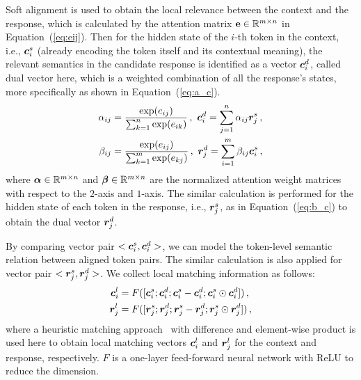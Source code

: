 \documentclass[letterpaper]{article} \usepackage{aaai19}  \usepackage{times}  \usepackage{helvet}  \usepackage{courier}  \usepackage{url}  \usepackage{graphicx}
\newcommand{\mat}[1]{\bf{#1}}
\newcommand{\RR}{\mathbb{R}}
\begin{document}
Soft alignment is used to obtain the local relevance between the context and the response, which is calculated by the attention matrix ${\mat e} \in \RR^{m \times n}$  in Equation~(\ref{eq:eij}). Then for the hidden state of the $i$-th token in the context, i.e., ${\bm{c}}^s_i$ (already encoding the token itself and its contextual meaning), the relevant semantics in the candidate response is 
identified as a vector ${\bm{c}}^d_i$, called dual vector here, which is a weighted combination of all the response's states, more specifically as shown in Equation~(\ref{eq:a_c}).
\begin{align}
\label{eq:a_c}
\alpha_{ij} & = \frac{\exp(e_{ij})}{\sum_{k=1}^{n}\exp(e_{ik})} \,, ~{\bm{c}}^d_i =\sum_{j=1}^{n}\alpha_{ij} {\bm{r}}^s_j \,,\\
\label{eq:b_c}
\beta_{ij} & = \frac{\exp(e_{ij})}{\sum_{k=1}^{m}\exp(e_{kj})} \,, ~{\bm{r}}^d_j =\sum_{i=1}^{m}\beta_{ij} {\bm{c}}^s_i \,,
\end{align}
\noindent where ${\vect \alpha} \in \RR^{m \times n}$ and ${\vect \beta} \in \RR^{m \times n}$ are the normalized attention weight matrices with respect to the $2$-axis and $1$-axis. The similar calculation is performed for the hidden state of each token in the response, i.e., ${\bm{r}}^s_j$, 
as in
Equation~(\ref{eq:b_c}) to obtain the dual vector ${\bm{r}}^d_j$. 

By comparing vector pair $<{\bm{c}}_i^s, {\bm{c}}_i^d>$, we can model the token-level semantic relation between aligned token pairs. The similar calculation is also applied for vector pair $<{\bm{r}}_j^s,{\bm{r}}_j^d>$. We collect local matching information as follows:
\begin{align}
\label{eq:infer1}
{\bm{c}}^l_i &= F([{\bm{c}}^s_i;{\bm{c}}^d_i;{\bm{c}}^s_i - {\bm{c}}^d_i ;{\bm{c}}^s_i \odot {\bm{c}}^d_i]) \,,\\
\label{eq:infer2}
{\bm{r}}^l_j &= F([{\bm{r}}^s_j;{\bm{r}}^d_j;{\bm{r}}^s_j - {\bm{r}}^d_j; {\bm{r}}^s_j \odot {\bm{r}}^d_j]) \,,
\end{align}
\noindent where a heuristic matching approach~\cite{DBLP:conf/acl/MouMLX0YJ16} with difference and element-wise product is used here to obtain local matching vectors ${\bm{c}}^l_i$ and ${\bm{r}}^l_j$ for the context and response, respectively. 
$F$ is a one-layer feed-forward neural network with ReLU to reduce the dimension. 
\end{document}

